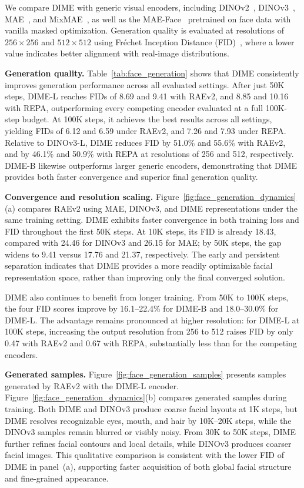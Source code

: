 \documentclass[10pt,journal,compsoc]{IEEEtran}
\begin{document}
We compare DIME with generic visual encoders, including DINOv2~\cite{oquab2023dinov2}, DINOv3~\cite{simeoni2025dinov3}, MAE~\cite{he2022masked}, and MixMAE~\cite{liu2023mixmae}, as well as the MAE-Face~\cite{ma2024facial} pretrained on face data with vanilla masked optimization. Generation quality is evaluated at resolutions of $256{\times}256$ and $512{\times}512$ using Fr\'echet Inception Distance (FID)~\cite{heusel2017gans}, where a lower value indicates better alignment with real-image distributions.

\noindent\textbf{Generation quality.}
Table~\ref{tab:face_generation} shows that DIME consistently improves generation performance across all evaluated settings. After just 50K steps, DIME-L reaches FIDs of 8.69 and 9.41 with RAEv2, and 8.85 and 10.16 with REPA, outperforming every competing encoder evaluated at a full 100K-step budget. At 100K steps, it achieves the best results across all settings, yielding FIDs of 6.12 and 6.59 under RAEv2, and 7.26 and 7.93 under REPA. Relative to DINOv3-L, DIME reduces FID by 51.0\% and 55.6\% with RAEv2, and by 46.1\% and 50.9\% with REPA at resolutions of 256 and 512, respectively. DIME-B likewise outperforms larger generic encoders, demonstrating that DIME provides both faster convergence and superior final generation quality.



\noindent\textbf{Convergence and resolution scaling.} Figure~\ref{fig:face_generation_dynamics}(a) compares RAEv2 using MAE, DINOv3, and DIME representations under the same training setting. DIME exhibits faster convergence in both training loss and FID throughout the first 50K steps. At 10K steps, its FID is already 18.43, compared with 24.46 for DINOv3 and 26.15 for MAE; by 50K steps, the gap widens to 9.41 versus 17.76 and 21.37, respectively. The early and persistent separation indicates that DIME provides a more readily optimizable facial representation space, rather than improving only the final converged solution.

DIME also continues to benefit from longer training. From 50K to 100K steps, the four FID scores improve by 16.1--22.4\% for DIME-B and 18.0--30.0\% for DIME-L. The advantage remains pronounced at higher resolution: for DIME-L at 100K steps, increasing the output resolution from 256 to 512 raises FID by only 0.47 with RAEv2 and 0.67 with REPA, substantially less than for the competing encoders.




\noindent\textbf{Generated samples.}
Figure~\ref{fig:face_generation_samples} presents samples generated by RAEv2 with the DIME-L encoder. Figure~\ref{fig:face_generation_dynamics}(b) compares generated samples during training. Both DIME and DINOv3 produce coarse facial layouts at 1K steps, but DIME resolves recognizable eyes, mouth, and hair by 10K--20K steps, while the DINOv3 samples remain blurred or visibly noisy. From 30K to 50K steps, DIME further refines facial contours and local details, while DINOv3 produces coarser facial images. This qualitative comparison is consistent with the lower FID of DIME in panel~(a), supporting faster acquisition of both global facial structure and fine-grained appearance.
\end{document}
